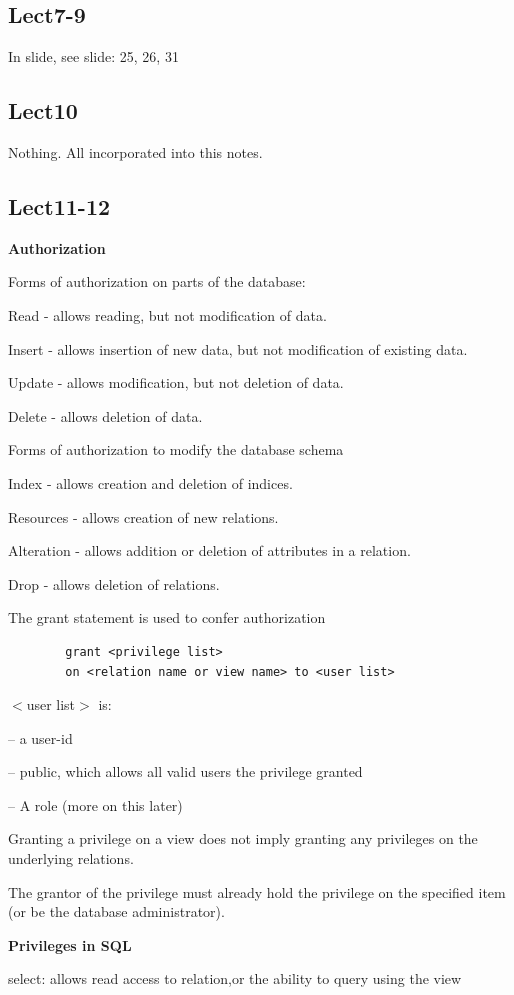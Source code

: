 \documentclass[8pt, a4paper, oneside, twocolumn]{extarticle}
\begin{document}
\subsection{Lect7-9}
In slide, see slide: 25, 26, 31
\subsection{Lect10}
Nothing. All incorporated into this notes.
\subsection{Lect11-12}
\textbf{Authorization}

Forms of authorization on parts of  the database:

Read - allows reading, but not modification of data.

Insert - allows insertion of new data, but not modification of existing data.

Update - allows modification, but not deletion of data.

Delete - allows deletion of data.

Forms of authorization to modify the database schema

Index - allows creation and deletion of indices.

Resources - allows creation of new relations.

Alteration - allows addition or deletion of attributes in a relation.

Drop - allows deletion of relations.

The grant statement is used to confer authorization

\begin{verbatim}
        grant <privilege list>
        on <relation name or view name> to <user list>
\end{verbatim}
$<$user list$>$ is:

--  a user-id

-- public, which allows all valid users the privilege granted

-- A role (more on this later)

Granting a privilege on a view does not imply granting any privileges on the underlying relations.

The grantor of the privilege must already hold the privilege on the specified item (or be the database administrator).

\textbf{Privileges in SQL}

select: allows read access to relation,or the ability to query using the view
\end{document}
